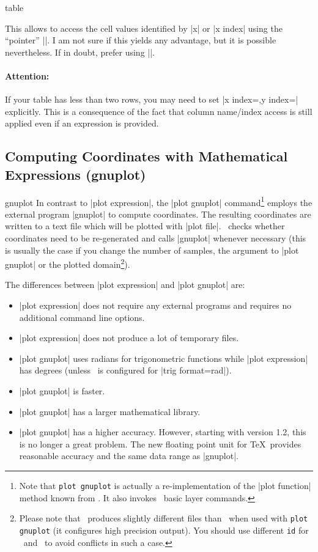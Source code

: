 {\begin{addplotoperation}[]{table}{}
\begin{enumerate}
		This allows to access the cell values identified by |x| or |x index| using the ``pointer'' |\columnx|. I am not sure if this yields any advantage, but it is possible nevertheless. If in doubt, prefer using |\thisrow|.
	\end{enumerate}

	\paragraph{Attention:} If your table has less than two rows, you may need to set |x index={},y index={}| explicitly. This is a consequence of the fact that column name/index access is still applied even if an expression is provided.
\end{addplotoperation}

\subsection{Computing Coordinates with Mathematical Expressions (gnuplot)}

\begin{addplotoperation}[]{gnuplot}{}
In contrast to |plot expression|, the |plot gnuplot| command\footnote{Note that \texttt{plot gnuplot} is actually a re-implementation of the |plot function| method known from \PGF. It also invokes \PGF\ basic layer commands.} employs the external program |gnuplot| to compute coordinates. The resulting coordinates are written to a text file which will be plotted with |plot file|. \PGF\ checks whether coordinates need to be re-generated and calls |gnuplot| whenever necessary (this is usually the case if you change the number of samples, the argument to |plot gnuplot| or the plotted domain\footnote{Please note that \PGFPlots\ produces slightly different files than \Tikz\ when used with \texttt{plot gnuplot} (it configures high precision output). You should use different \texttt{id} for \PGFPlots\ and \Tikz\ to avoid conflicts in such a case.}).

The differences between |plot expression| and |plot gnuplot| are:
\begin{itemize}
	\item |plot expression| does not require any external programs and requires no additional command line options.
	\item |plot expression| does not produce a lot of temporary files.
	\item |plot gnuplot| uses radians for trigonometric functions while |plot expression| has degrees (unless \pgfname\ is configured for |trig format=rad|).
	\item |plot gnuplot| is faster.
	\item |plot gnuplot| has a larger mathematical library.
	\item |plot gnuplot| has a higher accuracy. However, starting with version 1.2, this is no longer a great problem. The new floating point unit for \TeX\ provides reasonable accuracy and the same data range as |gnuplot|.
\end{itemize}


\end{addplotoperation}}
